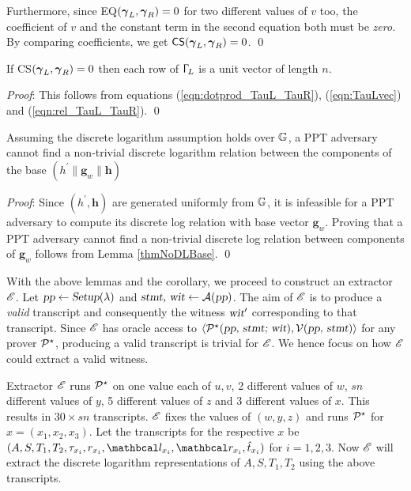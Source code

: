 Furthermore, since \textsf{EQ}$(\vecnb{\gamma}_L, \vecnb{\gamma}_R)=0$ for two different values of $v$ too, the coefficient of $v$ and the constant term in the second equation both must be \textit{zero}.  
By comparing coefficients, we get $\textsf{CS}(\vecnb{\gamma}_L, \vecnb{\gamma}_R)=0$. \hfill{\small \qed}

\begin{lemma}\label{lemTauLBinary}
If \textsf{CS}$(\vecnb{\gamma}_L, \vecnb{\gamma}_R) = 0$ then each row of $\Upgamma_L$ is a unit vector of length $n$.
\end{lemma}
\textit{Proof}: This follows from equations (\ref{eqn:dotprod_TauL_TauR}), (\ref{eqn:TauLvec}) and (\ref{eqn:rel_TauL_TauR}). \hfill{\small \qed}

\begin{corollary}\label{corollaryNoDL}
Assuming the discrete logarithm assumption holds over $\G$, a \textsf{PPT} adversary cannot find a non-trivial discrete logarithm relation between the components of the base $(h^{\prime}\|\textbf{g}_w \| \textbf{h})$
\end{corollary}
\textit{Proof}: Since $(h^{\prime}, \textbf{h})$ are generated uniformly from $\G$, it is infeasible for a PPT adversary to compute its discrete log relation with base vector $\textbf{g}_w$.
Proving that a \textsf{PPT} adversary cannot find a non-trivial discrete log relation between components of $\textbf{g}_w$ follows from Lemma \ref{thmNoDLBase}. \hfill{\small \qed}


With the above lemmas and the corollary, we proceed to construct an extractor $\E$. 
Let $\textsl{pp} \leftarrow \textsl{Setup}(\lambda)$ and $\textsl{stmt, wit} \leftarrow \mathcal{A}(\textsl{pp})$.
The aim of $\E$ is to produce a \textit{valid} transcript and consequently the witness $\textsl{wit}^{\prime}$ corresponding to that transcript.
Since $\E$ has oracle access to $\langle \P^{\star}(\textsl{pp, stmt; wit}), \V(\textsl{pp, stmt}) \rangle$ for any prover $\P^{\star}$, producing a valid transcript
is trivial for $\E$. We hence focus on how $\E$ could extract a valid witness. 

Extractor $\E$ runs $\P^{\star}$ on one value each of $u, v$, 2 different values of $w$, $sn$ different values of $y$,
5 different values of $z$ and 3 different values of $x$. This results in $30\times sn$ transcripts.
$\E$ fixes the values of $(w,y,z)$ and runs $\P^{\star}$ for $x=(x_1,x_2,x_3)$. Let the transcripts for the respective $x$ be $(A, S, T_1, T_2, \tau_{x_i}, r_{x_i}, \lvec_{x_i}, \rvec_{x_i}, \hat{t}_{x_i})$ for $i=1,2,3$. Now $\E$ will extract the discrete logarithm representations of $A, S, T_1, T_2$ using the above transcripts.\\


